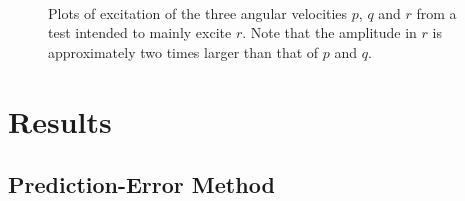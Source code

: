 \begin{figure}[tbp]
  \centering
  \qquad
  \\
  \caption{\label{fig:rTest}%
 Plots of excitation of the three angular velocities $p$, $q$ and $r$ from a test intended to mainly excite $r$. Note that the amplitude in $r$ is approximately two times larger than that of $p$ and $q$.}
\end{figure}


\section{Results}

\subsection{Prediction-Error Method}

